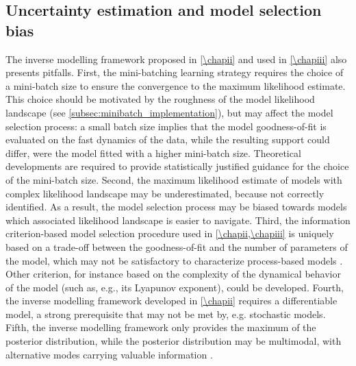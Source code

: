 \subsection{Uncertainty estimation and model selection bias}
The inverse modelling framework proposed in \cref{\chapii} and used in \cref{\chapiii} also presents pitfalls.
%
First, the mini-batching learning strategy requires the choice of a mini-batch size to ensure the convergence to the maximum likelihood estimate. This choice should be motivated by the roughness of the model likelihood landscape (see \cref{subsec:minibatch_implementation}), but may affect the model selection process:
% 
a small batch size implies that the model goodness-of-fit is evaluated on the fast dynamics of the data, while the resulting support could differ, were the model fitted with a higher mini-batch size. Theoretical developments are required to provide statistically justified guidance for the choice of the mini-batch size. 
% 
Second, the maximum likelihood estimate of models with complex likelihood landscape may be underestimated, because not correctly identified. As a result, the model selection process may be biased towards models which associated likelihood landscape is easier to navigate. 
% 
Third, the information criterion-based model selection procedure used in \cref{\chapii,\chapiii} is uniquely based on a trade-off between the goodness-of-fit and the number of parameters of the model, which may not be satisfactory to characterize process-based models \citep{Clermont2015}. 
% 
Other criterion, for instance based on the complexity of the dynamical behavior of the model (such as, e.g., its Lyapunov exponent), could be developed.
% 
Fourth, the inverse modelling framework developed in \cref{\chapii} requires a differentiable model, a strong prerequisite that may not be met by, e.g. stochastic models. 
% 
Fifth, the inverse modelling framework only provides the maximum of the posterior distribution, while the posterior distribution may be multimodal, with alternative modes carrying valuable information \citep{Wilson2020}.%

